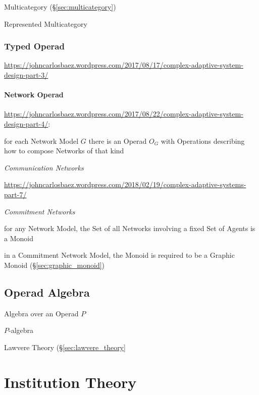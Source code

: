 Multicategory (\S\ref{sec:multicategory})

Represented Multicategory



\subsubsection{Typed Operad}\label{sec:typed_operad}

\url{https://johncarlosbaez.wordpress.com/2017/08/17/complex-adaptive-system-design-part-3/}



\paragraph{Network Operad}\label{sec:network_operad}\hfill

\url{https://johncarlosbaez.wordpress.com/2017/08/22/complex-adaptive-system-design-part-4/}:

for each Network Model $G$ there is an Operad $O_G$ with Operations describing
how to compose Networks of that kind

\emph{Communication Networks}

\url{https://johncarlosbaez.wordpress.com/2018/02/19/complex-adaptive-systems-part-7/}

\emph{Commitment Networks}

for any Network Model, the Set of all Networks involving a fixed Set of Agents
is a Monoid

in a Commitment Network Model, the Monoid is required to be a Graphic Monoid
(\S\ref{sec:graphic_monoid})



\subsection{Operad Algebra}\label{sec:operad_algebra}

Algebra over an Operad $P$

$P$-algebra

Lawvere Theory (\S\ref{sec:lawvere_theory}



\section{Institution Theory}\label{sec:institution_theory}

